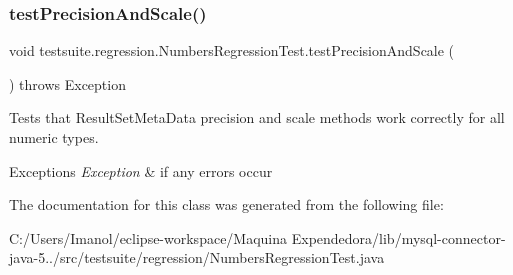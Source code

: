 \subsubsection{\texorpdfstring{test\+Precision\+And\+Scale()}{testPrecisionAndScale()}}
{\footnotesize\ttfamily void testsuite.\+regression.\+Numbers\+Regression\+Test.\+test\+Precision\+And\+Scale (\begin{DoxyParamCaption}{ }\end{DoxyParamCaption}) throws Exception}

Tests that Result\+Set\+Meta\+Data precision and scale methods work correctly for all numeric types.


\begin{DoxyExceptions}{Exceptions}
{\em Exception} & if any errors occur \\
\hline
\end{DoxyExceptions}


The documentation for this class was generated from the following file\+:\begin{DoxyCompactItemize}
\item 
C\+:/\+Users/\+Imanol/eclipse-\/workspace/\+Maquina Expendedora/lib/mysql-\/connector-\/java-\/5../src/testsuite/regression/Numbers\+Regression\+Test.\+java\end{DoxyCompactItemize}
